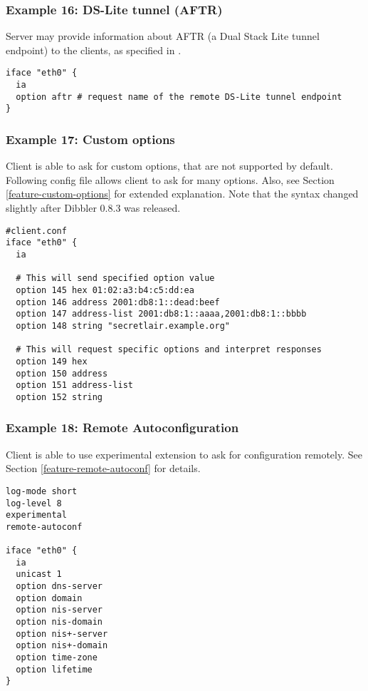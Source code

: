 \subsubsection{Example 16: DS-Lite tunnel (AFTR)}
\label{example-server-ds-lite}
Server may provide information about AFTR (a Dual Stack Lite tunnel
endpoint) to the clients, as specified in \cite{rfc6334}.

\begin{lstlisting}
iface "eth0" {
  ia
  option aftr # request name of the remote DS-Lite tunnel endpoint
}
\end{lstlisting}

\subsubsection{Example 17: Custom options}
Client is able to ask for custom options, that are not supported by
default. Following config file allows client to ask for many
options. Also, see Section \ref{feature-custom-options} for
extended explanation. Note that the syntax changed slightly
after Dibbler 0.8.3 was released.

\begin{lstlisting}
#client.conf
iface "eth0" {
  ia

  # This will send specified option value  
  option 145 hex 01:02:a3:b4:c5:dd:ea
  option 146 address 2001:db8:1::dead:beef
  option 147 address-list 2001:db8:1::aaaa,2001:db8:1::bbbb
  option 148 string "secretlair.example.org"

  # This will request specific options and interpret responses
  option 149 hex
  option 150 address
  option 151 address-list
  option 152 string
\end{lstlisting}

\subsubsection{Example 18: Remote Autoconfiguration}
Client is able to use experimental extension to ask for configuration
remotely. See Section \ref{feature-remote-autoconf} for details.

\begin{lstlisting}
log-mode short
log-level 8
experimental
remote-autoconf

iface "eth0" {
  ia
  unicast 1
  option dns-server
  option domain
  option nis-server
  option nis-domain
  option nis+-server
  option nis+-domain
  option time-zone
  option lifetime
}
\end{lstlisting}
